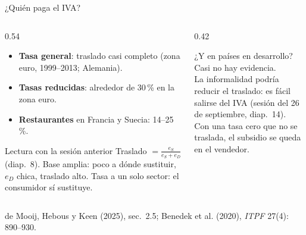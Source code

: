 \documentclass[aspectratio=169,11pt]{beamer}
\newcommand{\fuente}[1]{\par\vfill{\small\color{cGris}#1\par}}
\begin{document}
\begin{frame}{¿Quién paga el IVA?}
  \begin{columns}[T]
    \begin{column}{0.54\textwidth}
      \begin{itemize}
        \item \textbf{Tasa general}: traslado casi completo (zona euro, 1999--2013; Alemania).
        \item \textbf{Tasas reducidas}: alrededor de 30\,\% en la zona euro.
        \item \textbf{Restaurantes} en Francia y Suecia: 14--25\,\%.
      \end{itemize}
      \pause
      \begin{block}{Lectura con la sesión anterior}
        Traslado $= \frac{e_S}{e_S+e_D}$ (diap.~8). Base amplia: poco a dónde sustituir, $e_D$ chica, traslado alto. Tasa a un solo sector: el consumidor sí sustituye.
      \end{block}
    \end{column}
    \begin{column}{0.42\textwidth}
      \pause
      \begin{alertblock}{¿Y en países en desarrollo?}
        Casi no hay evidencia.\\[3pt]
        La informalidad podría reducir el traslado: es fácil salirse del IVA (sesión del 26 de septiembre, diap.~14).\\[3pt]
        Con una tasa cero que no se traslada, el subsidio se queda en el vendedor.
      \end{alertblock}
    \end{column}
  \end{columns}
  \fuente{de Mooij, Hebous y Keen (2025), sec.~2.5; Benedek et al. (2020), \emph{ITPF} 27(4): 890--930.}
\end{frame}
\end{document}
